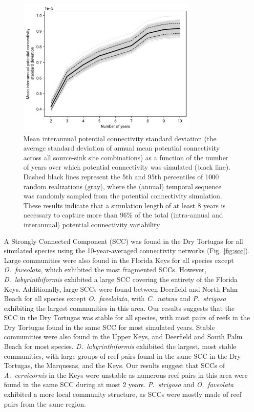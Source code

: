 \documentclass[preprint,12pt,authoryear]{elsarticle}
\begin{document}
	\begin{figure}
		\centering
		\includegraphics[width=0.8\textwidth]{figures/fig_cm_std.png}
		\caption{Mean interannual potential connectivity standard deviation (the average standard deviation of annual mean potential connectivity across all source-sink site combinations) as a function of the number of years over which potential connectivity was simulated (black line). Dashed black lines represent the 5th and 95th percentiles of 1000 random realizations (gray), where the (annual) temporal sequence was randomly sampled from the potential connectivity simulation. These results indicate that a simulation length of at least 8 years is necessary to capture more than 96\% of the total (intra-annual and interannual) potential connectivity variability}\label{fig:saturation}
	\end{figure}
	
	A Strongly Connected Component (SCC) was found in the Dry Tortugas for all simulated species using the 10-year-averaged connectivity networks (Fig. \ref{fig:scc}). Large communities were also found in the Florida Keys for all species except \textit{O.~faveolata}, which exhibited the most fragmented SCCs. However, \textit{D.~labyrinthiformis} exhibited a large SCC covering the entirety of the Florida Keys. Additionally, large SCCs were found between Deerfield and North Palm Beach for all species except \textit{O.~favelolata}, with \textit{C.~natans} and \textit{P.~strigosa} exhibiting the largest communities in this area. Our results suggests that the SCC in the Dry Tortugas was stable for all species, with most pairs of reefs in the Dry Tortugas found in the same SCC for most simulated years. Stable communities were also found in the Upper Keys, and Deerfield and South Palm Beach for most species. \textit{D.~labyrinthiformis} exhibited the largest, most stable communities, with large groups of reef pairs found in the same SCC in the Dry Tortugas, the Marquesas, and the Keys. Our results suggest that SCCs of \textit{A.~cervicornis} in the Keys were unstable as numerous reef pairs in this area were found in the same SCC during at most 2 years. \textit{P.~strigosa} and  \textit{O.~faveolata} exhibited a more local community structure, as SCCs were mostly made of reef pairs from the same region.
\end{document}
